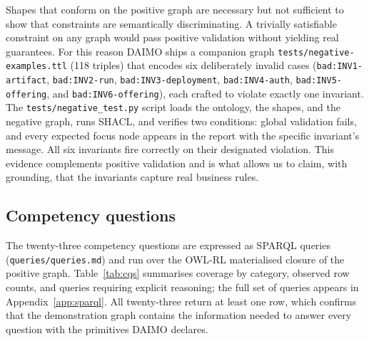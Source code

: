 \documentclass[Afour,sagev,times]{sagej}
\newcommand{\code}[1]{\texttt{#1}}
\begin{document}
Shapes that conform on the positive graph are necessary but not sufficient to show that constraints are semantically discriminating. A trivially satisfiable constraint on any graph would pass positive validation without yielding real guarantees. For this reason DAIMO ships a companion graph \code{tests/negative-examples.ttl} (118 triples) that encodes six deliberately invalid cases (\code{bad:INV1-artifact}, \code{bad:INV2-run}, \code{bad:INV3-deployment}, \code{bad:INV4-auth}, \code{bad:INV5-offering}, and \code{bad:INV6-offering}), each crafted to violate exactly one invariant. The \code{tests/negative\_test.py} script loads the ontology, the shapes, and the negative graph, runs SHACL, and verifies two conditions: global validation fails, and every expected focus node appears in the report with the specific invariant's message. All six invariants fire correctly on their designated violation. This evidence complements positive validation and is what allows us to claim, with grounding, that the invariants capture real business rules.

\subsection{Competency questions}\label{sec:eval-cqs}

The twenty-three competency questions are expressed as SPARQL queries (\code{queries/queries.md}) and run over the OWL-RL materialised closure of the positive graph. Table~\ref{tab:cqs} summarises coverage by category, observed row counts, and queries requiring explicit reasoning; the full set of queries appears in Appendix~\ref{app:sparql}. All twenty-three return at least one row, which confirms that the demonstration graph contains the information needed to answer every question with the primitives DAIMO declares.
\end{document}
